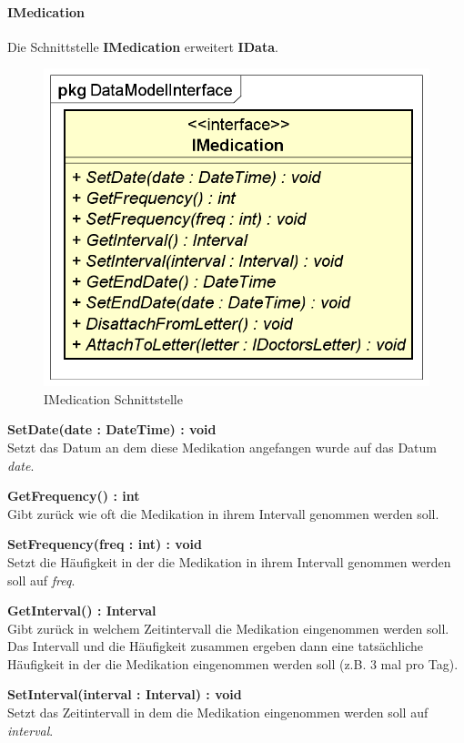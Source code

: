 \documentclass[a4paper]{scrreprt}
\begin{document}
\paragraph{IMedication}
Die Schnittstelle \textbf{IMedication} erweitert \textbf{IData}.

\begin{figure}[H]
\centering
\includegraphics[width=0.75\textheight]{graphics/Klassendiagramme/Model/IMedication.png}
\caption{IMedication Schnittstelle}
\end{figure}
\textbf{SetDate(date : DateTime) : void}\\
Setzt das Datum an dem diese Medikation angefangen wurde auf das Datum \textit{date}.

\textbf{GetFrequency() : int}\\
Gibt zurück wie oft die Medikation in ihrem Intervall genommen werden soll.

\textbf{SetFrequency(freq : int) : void}\\
Setzt die Häufigkeit in der die Medikation in ihrem Intervall genommen werden soll auf \textit{freq}.

\textbf{GetInterval() : Interval}\\
Gibt zurück in welchem Zeitintervall die Medikation eingenommen werden soll. Das Intervall und die Häufigkeit zusammen ergeben dann eine tatsächliche Häufigkeit in der die Medikation eingenommen werden soll (z.B. 3 mal pro Tag).

\textbf{SetInterval(interval : Interval) : void}\\
Setzt das Zeitintervall in dem die Medikation eingenommen werden soll auf \textit{interval}.
\end{document}
